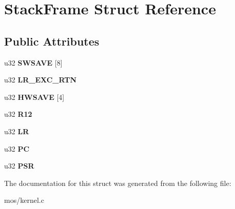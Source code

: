 \hypertarget{structStackFrame}{}\section{Stack\+Frame Struct Reference}
\label{structStackFrame}
\subsection*{Public Attributes}
\begin{DoxyCompactItemize}
\item 
\mbox{\label{structStackFrame_aa0c7f76aaf7f2f1253ff4ca685382a3a}} 
u32 {\bfseries S\+W\+S\+A\+VE} \mbox{[}8\mbox{]}
\item 
\mbox{\label{structStackFrame_ab264ea9c3ded2a4ea46855db48ce2d86}} 
u32 {\bfseries L\+R\+\_\+\+E\+X\+C\+\_\+\+R\+TN}
\item 
\mbox{\label{structStackFrame_adc515b48af18333245add1f3d9fbdfce}} 
u32 {\bfseries H\+W\+S\+A\+VE} \mbox{[}4\mbox{]}
\item 
\mbox{\label{structStackFrame_ac4030991721c5f10e593ec97ead1525a}} 
u32 {\bfseries R12}
\item 
\mbox{\label{structStackFrame_a7b93475e91b65b664e4e409306f9f175}} 
u32 {\bfseries LR}
\item 
\mbox{\label{structStackFrame_aa617ff429f69a61a15ec6b88e565b631}} 
u32 {\bfseries PC}
\item 
\mbox{\label{structStackFrame_ab81daac3bde3228aa4509380466f6749}} 
u32 {\bfseries P\+SR}
\end{DoxyCompactItemize}


The documentation for this struct was generated from the following file\+:\begin{DoxyCompactItemize}
\item 
mos/kernel.\+c\end{DoxyCompactItemize}
